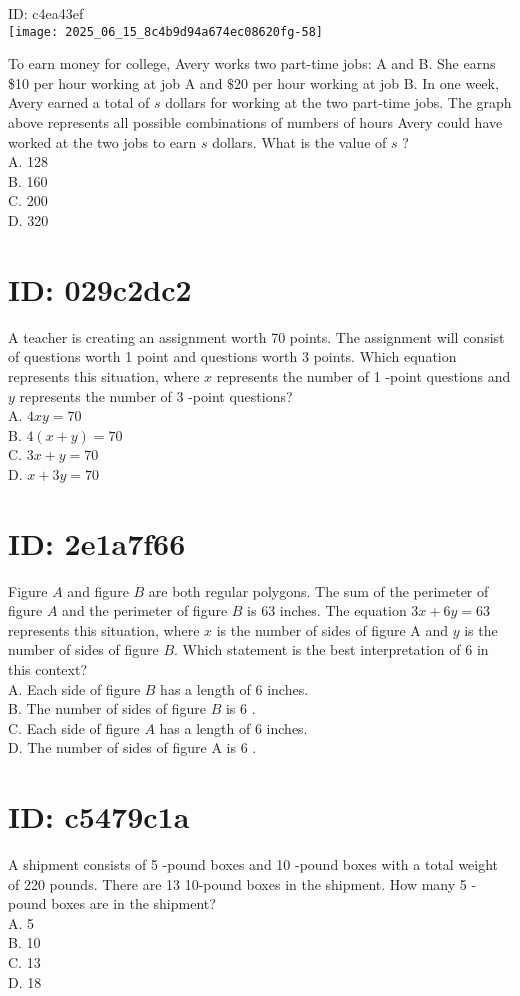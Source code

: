 ID: c4ea43ef\\
\texttt{[image: 2025\_06\_15\_8c4b9d94a674ec08620fg-58]}

To earn money for college, Avery works two part-time jobs: A and B. She earns \$10 per hour working at job A and $\$ 20$ per hour working at job B. In one week, Avery earned a total of $s$ dollars for working at the two part-time jobs. The graph above represents all possible combinations of numbers of hours Avery could have worked at the two jobs to earn $s$ dollars. What is the value of $s$ ?\\
A. 128\\
B. 160\\
C. 200\\
D. 320

\section*{ID: 029c2dc2}
A teacher is creating an assignment worth 70 points. The assignment will consist of questions worth 1 point and questions worth 3 points. Which equation represents this situation, where $x$ represents the number of 1 -point questions and $y$ represents the number of 3 -point questions?\\
A. $4 x y=70$\\
B. $4(x+y)=70$\\
C. $3 x+y=70$\\
D. $x+3 y=70$

\section*{ID: 2e1a7f66}
Figure $A$ and figure $B$ are both regular polygons. The sum of the perimeter of figure $A$ and the perimeter of figure $B$ is 63 inches. The equation $3 x+6 y=63$ represents this situation, where $x$ is the number of sides of figure A and $y$ is the number of sides of figure $B$. Which statement is the best interpretation of 6 in this context?\\
A. Each side of figure $B$ has a length of 6 inches.\\
B. The number of sides of figure $B$ is 6 .\\
C. Each side of figure $A$ has a length of 6 inches.\\
D. The number of sides of figure A is 6 .

\section*{ID: c5479c1a}
A shipment consists of 5 -pound boxes and 10 -pound boxes with a total weight of 220 pounds. There are 13 10-pound boxes in the shipment. How many 5 -pound boxes are in the shipment?\\
A. 5\\
B. 10\\
C. 13\\
D. 18

